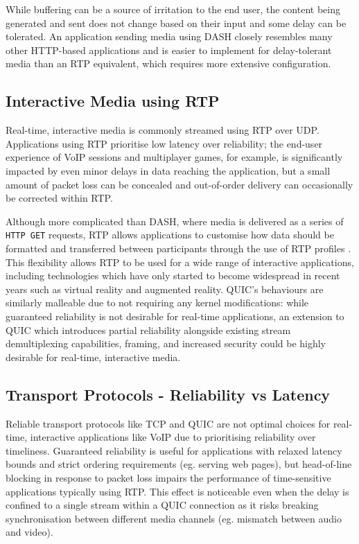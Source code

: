 \documentclass{mprop}
\begin{document}
While buffering can be a source of irritation to the end user, the content being generated and sent does not change based on their input and some delay can be tolerated. An application sending media using DASH closely resembles many other HTTP-based applications and is easier to implement for delay-tolerant media than an RTP equivalent, which requires more extensive configuration.

\subsection{Interactive Media using RTP}

Real-time, interactive media is commonly streamed using RTP over UDP. Applications using RTP prioritise low 
latency over reliability; the end-user experience of VoIP sessions and multiplayer games, for 
example, is significantly impacted by even minor delays in data reaching the application, but a 
small amount of packet loss can be concealed and out-of-order delivery can occasionally be 
corrected within RTP.

Although more complicated than DASH, where media is delivered as a series of \texttt{HTTP GET} 
requests, RTP allows applications to customise how data should be formatted and transferred 
between participants through the use of RTP profiles \cite{RTP-RFC}. This flexibility allows RTP 
to be used for a wide range of interactive applications, including technologies which have only started 
to become widespread in recent years such as virtual reality and augmented reality. QUIC's behaviours are similarly malleable due 
to not requiring any kernel modifications: while guaranteed reliability is not desirable for 
real-time applications, an extension to QUIC which introduces partial reliability alongside 
existing stream demultiplexing capabilities, framing, and increased security could be highly 
desirable for real-time, interactive media.

\subsection{Transport Protocols - Reliability vs Latency}

Reliable transport protocols like TCP and QUIC are not optimal choices for real-time, interactive 
applications like VoIP due to prioritising reliability over timeliness. Guaranteed reliability is 
useful for applications with relaxed latency bounds and strict ordering requirements (eg. serving 
web pages), but head-of-line blocking in response to packet loss impairs the performance of time-sensitive applications typically using RTP. This effect is noticeable even when the delay is confined to a single stream within a QUIC connection as it risks breaking synchronisation between different media channels (eg. mismatch between audio and video).
\end{document}

